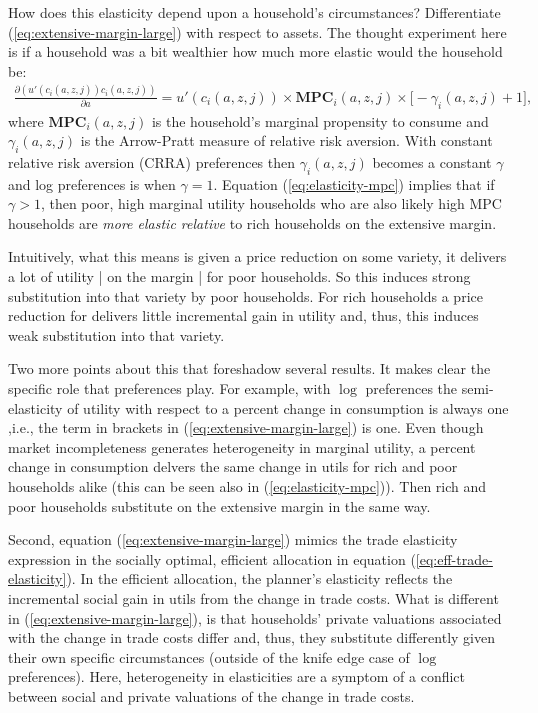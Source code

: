 \documentclass[12pt,pdftex]{article}
\begin{document}
\begin{onehalfspacing}
How does this elasticity depend upon a household's circumstances? Differentiate (\ref{eq:extensive-margin-large}) with respect to assets. The thought experiment here is if a household was a bit wealthier how much more elastic would the household be:
\begin{align}
\frac{\partial (u'(c_{i}(a,z,j))c_{i}(a,z,j))}{\partial a} = u'(c_{i}(a,z,j))\times \mathbf{MPC}_{i}(a,z,j) \times \bigg[-\gamma_{i}(a,z,j) + 1\bigg], \label{eq:elasticity-mpc}
\end{align}
where $\mathbf{MPC}_{i}(a,z,j)$ is the household's marginal propensity to consume and $\gamma_{i}(a,z,j)$ is the Arrow-Pratt measure of relative risk aversion. With constant relative risk aversion (CRRA) preferences then $\gamma_{i}(a,z,j)$ becomes a constant $\gamma$ and log preferences is when $\gamma = 1$. Equation (\ref{eq:elasticity-mpc}) implies that if $\gamma > 1$, then poor, high marginal utility households who are also likely high MPC households are \emph{more elastic relative} to rich households on the extensive margin.

Intuitively, what this means is given a price reduction on some variety, it delivers a lot of utility | on the margin | for poor households. So this induces strong substitution into that variety by poor households. For rich households a price reduction for delivers little incremental gain in utility and, thus, this induces weak substitution into that variety.

Two more points about this that foreshadow several results. It makes clear the specific role that preferences play. For example, with $\log$ preferences the semi-elasticity of utility with respect to a percent change in consumption is always one ,i.e., the term in brackets in (\ref{eq:extensive-margin-large}) is one. Even though market incompleteness generates heterogeneity in marginal utility, a percent change in consumption delvers the same change in utils for rich and poor households alike (this can be seen also in (\ref{eq:elasticity-mpc})). Then rich and poor households substitute on the extensive margin in the same way.

Second, equation (\ref{eq:extensive-margin-large})  mimics the trade elasticity expression in the socially optimal, efficient allocation in equation (\ref{eq:eff-trade-elasticity}). In the efficient allocation, the planner's elasticity reflects the incremental social gain in utils from the change in trade costs. What is different in (\ref{eq:extensive-margin-large}), is that households' private valuations associated with the change in trade costs differ and, thus, they substitute differently given their own specific circumstances (outside of the knife edge case of $\log$ preferences).  Here, heterogeneity in elasticities are a symptom of a conflict between social and private valuations of the change in trade costs.


\end{onehalfspacing}
\end{document}
